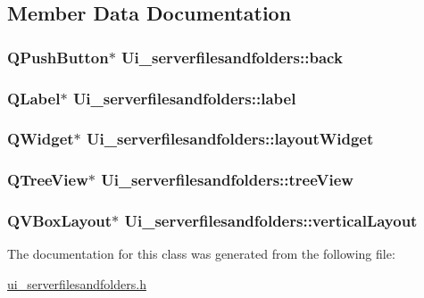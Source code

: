 \subsection{Member Data Documentation}
\hypertarget{classUi__serverfilesandfolders_a942d6d5883f0875665471278d70ffee7}{
\subsubsection[{back}]{\setlength{\rightskip}{0pt plus 5cm}Q\-Push\-Button$\ast$ Ui\-\_\-serverfilesandfolders\-::back}}\label{classUi__serverfilesandfolders_a942d6d5883f0875665471278d70ffee7}
\hypertarget{classUi__serverfilesandfolders_a9c02cefd8fed0f107977e36eb7511b4c}{
\subsubsection[{label}]{\setlength{\rightskip}{0pt plus 5cm}Q\-Label$\ast$ Ui\-\_\-serverfilesandfolders\-::label}}\label{classUi__serverfilesandfolders_a9c02cefd8fed0f107977e36eb7511b4c}
\hypertarget{classUi__serverfilesandfolders_a47a10c1749cf75c7fb9c3aaeea53494e}{
\subsubsection[{layout\-Widget}]{\setlength{\rightskip}{0pt plus 5cm}Q\-Widget$\ast$ Ui\-\_\-serverfilesandfolders\-::layout\-Widget}}\label{classUi__serverfilesandfolders_a47a10c1749cf75c7fb9c3aaeea53494e}
\hypertarget{classUi__serverfilesandfolders_a5e983a9840e30bc26a8b7f0640833c93}{
\subsubsection[{tree\-View}]{\setlength{\rightskip}{0pt plus 5cm}Q\-Tree\-View$\ast$ Ui\-\_\-serverfilesandfolders\-::tree\-View}}\label{classUi__serverfilesandfolders_a5e983a9840e30bc26a8b7f0640833c93}
\hypertarget{classUi__serverfilesandfolders_a29cf8c53fe60d27322921fde2a072f65}{
\subsubsection[{vertical\-Layout}]{\setlength{\rightskip}{0pt plus 5cm}Q\-V\-Box\-Layout$\ast$ Ui\-\_\-serverfilesandfolders\-::vertical\-Layout}}\label{classUi__serverfilesandfolders_a29cf8c53fe60d27322921fde2a072f65}


The documentation for this class was generated from the following file\-:\begin{DoxyCompactItemize}
\item 
\hyperlink{ui__serverfilesandfolders_8h}{ui\-\_\-serverfilesandfolders.\-h}\end{DoxyCompactItemize}
